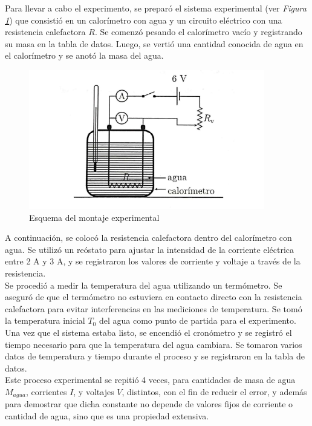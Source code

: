 \documentclass[10pt]{article}
\begin{document}
\begin{multicols*}{2}
Para llevar a cabo el experimento, se preparó el sistema experimental (ver \textit{Figura \ref{montaje}}) que consistió en un calorímetro con agua y un circuito eléctrico con una resistencia calefactora $R$. Se comenzó pesando el calorímetro vacío y registrando su masa en la tabla de datos. Luego, se vertió una cantidad conocida de agua en el calorímetro y se anotó la masa del agua.\\
\begin{figure}[H]
    \centering
    \includegraphics[scale=0.7]{montaje.png}
    \caption{Esquema del montaje experimental}
    \label{montaje}
\end{figure}
A continuación, se colocó la resistencia calefactora dentro del calorímetro con agua. Se utilizó un reóstato para ajustar la intensidad de la corriente eléctrica entre 2 A y 3 A, y se registraron los valores de corriente y voltaje a través de la resistencia.\\

Se procedió a medir la temperatura del agua utilizando un termómetro. Se aseguró de que el termómetro no estuviera en contacto directo con la resistencia calefactora para evitar interferencias en las mediciones de temperatura. Se tomó la temperatura inicial $T_0$ del agua como punto de partida para el experimento.\\

Una vez que el sistema estaba listo, se encendió el cronómetro y se registró el tiempo necesario para que la temperatura del agua cambiara. Se tomaron varios datos de temperatura y tiempo durante el proceso y se registraron en la tabla de datos.\\

Este proceso experimental se repitió 4 veces, para cantidades de masa de agua $M_{agua}$, corrientes $I$, y voltajes $V$, distintos, con el fin de reducir el error, y además para demostrar que dicha constante no depende de valores fijos de corriente o cantidad de agua, sino que es una propiedad extensiva.



\end{multicols*}
\end{document}

